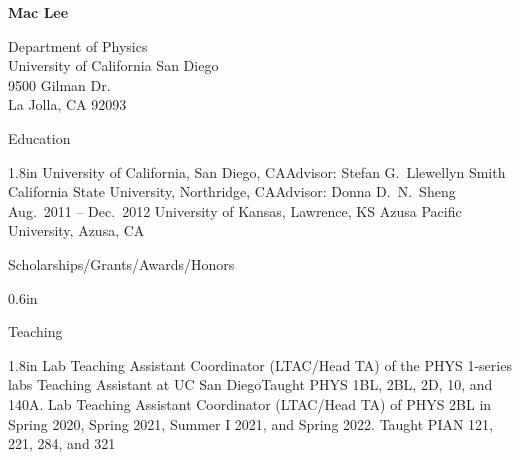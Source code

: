 \documentclass{cv}
\begin{document}
\centerline{\LARGE{\bfseries Mac Lee}}
\vspace{11pt}
\begin{minipage}[t]{0.4\textwidth}
  Department of Physics\\
  University of California San Diego\\
  9500 Gilman Dr.\\
  La Jolla, CA 92093\\
\end{minipage}
\hfill
\begin{minipage}[t]{0.4\textwidth}
\end{minipage}

\begin{block}{Education}
  \begin{entries}{1.8in}
      {University of California, San Diego, CA}{Advisor: Stefan G.\ Llewellyn Smith}
      {California State University, Northridge, CA}{Advisor: Donna D.\ N.\ Sheng}
      {Aug.~2011 -- Dec.~2012}
      {University of Kansas, Lawrence, KS}{}
      {Azusa Pacific University, Azusa, CA}{}
  \end{entries}
\end{block}

\begin{block}{Scholarships/Grants/Awards/Honors}
  \begin{entries}{0.6in}
  \end{entries}
\end{block}

\begin{block}{Teaching}
  \begin{entries}{1.8in}
      {Lab Teaching Assistant Coordinator (LTAC/Head TA) of the PHYS 1-series
      labs}
      {Teaching Assistant at UC San Diego}{Taught PHYS 1BL, 2BL, 2D, 10, and 140A. Lab
      Teaching Assistant Coordinator (LTAC/Head TA) of PHYS 2BL in Spring 2020,
      Spring 2021, Summer I 2021, and Spring 2022.}
      {Taught PIAN 121, 221, 284, and 321}
  \end{entries}
\end{block}
\end{document}
